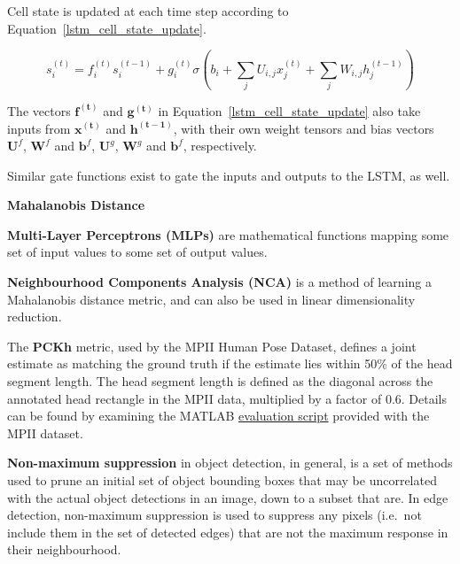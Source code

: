 \documentclass[a4paper, 12pt]{article}
\newcommand\phantomlabel[1]{\phantomsection\label{#1}}
\begin{document}
Cell state is updated at each time step according to
Equation~\ref{lstm_cell_state_update}.

\begin{equation}
        s_i^{(t)} = f_i^{(t)} s_i^{(t - 1)} + g_i^{(t)}
                \sigma \left( b_i + \sum_j U_{i, j} x_j^{(t)} + \sum_j W_{i, j} h_j^{(t - 1)}\right)
        \label{lstm_cell_state_update}
\end{equation}

The vectors $\boldsymbol{f^{(t)}}$ and $\boldsymbol{g^{(t)}}$ in
Equation~\ref{lstm_cell_state_update} also take inputs from $\boldsymbol{x^{(t)}}$
and $\boldsymbol{h^{(t - 1)}}$, with their own weight tensors and bias vectors
$\boldsymbol{U}^f$, $\boldsymbol{W}^f$ and $\boldsymbol{b}^f$, $\boldsymbol{U}^g$,
$\boldsymbol{W}^g$ and $\boldsymbol{b}^f$, respectively.

Similar gate functions exist to gate the inputs and outputs to the LSTM, as
well.


\textbf{Mahalanobis Distance}


\phantomlabel{multilayer_perceptron}
\textbf{Multi-Layer Perceptrons (MLPs)} are mathematical functions mapping some
set of input values to some set of output
values\citet{Goodfellow-et-al-2016-Book}.


\textbf{Neighbourhood Components Analysis (NCA)} is a method of learning a
Mahalanobis distance metric, and can also be used in linear dimensionality
reduction\citet{NIPS2004_2566}.

The \textbf{PCKh} metric, used by the MPII Human Pose Dataset, defines a joint
estimate as matching the ground truth if the estimate lies within 50\% of the
head segment length\citet{andriluka-2d-2014-853}. The head segment length is
defined as the diagonal across the annotated head rectangle in the MPII data,
multiplied by a factor of 0.6. Details can be found by examining the MATLAB
\href{http://human-pose.mpi-inf.mpg.de/results/mpii_human_pose/evalMPII.zip}{evaluation script}
provided with the MPII dataset.


\phantomlabel{nonmax_supression}
\textbf{Non-maximum suppression} in object detection, in general, is a set of
methods used to prune an initial set of object bounding boxes that may be
uncorrelated with the actual object detections in an image, down to a subset
that are\citet{DBLP:conf/accv/RotheGG14}. In edge detection, non-maximum
suppression is used to suppress any pixels (i.e.\ not include them in the set of
detected edges) that are not the maximum response in their neighbourhood.
\end{document}
